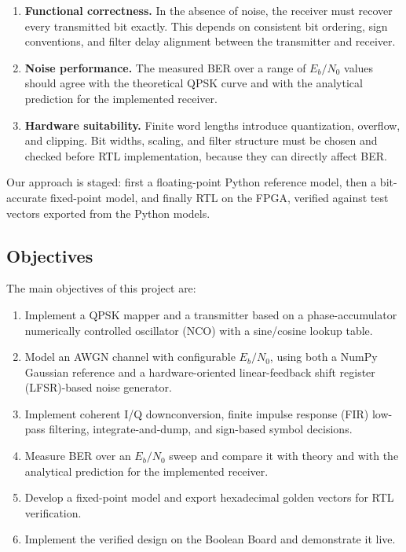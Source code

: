 \documentclass[10pt,twocolumn,letterpaper]{article}
\begin{document}
\begin{enumerate}
    \item \textbf{Functional correctness.}
    In the absence of noise, the receiver must recover every transmitted bit exactly. This depends on consistent bit ordering, sign conventions, and filter delay alignment between the transmitter and receiver.

    \item \textbf{Noise performance.}
    The measured BER over a range of $E_b/N_0$ values should agree with the theoretical QPSK curve and with the analytical prediction for the implemented receiver.

    \item \textbf{Hardware suitability.}
    Finite word lengths introduce quantization, overflow, and clipping. Bit widths, scaling, and filter structure must be chosen and checked before RTL implementation, because they can directly affect BER.
\end{enumerate}

Our approach is staged: first a floating-point Python reference model, then a bit-accurate fixed-point model, and finally RTL on the FPGA, verified against test vectors exported from the Python models.

\subsection{Objectives}

The main objectives of this project are:

\begin{enumerate}
    \item Implement a QPSK mapper and a transmitter based on a phase-accumulator numerically controlled oscillator (NCO) with a sine/cosine lookup table.

    \item Model an AWGN channel with configurable $E_b/N_0$, using both a NumPy Gaussian reference and a hardware-oriented linear-feedback shift register (LFSR)-based noise generator.

    \item Implement coherent I/Q downconversion, finite impulse response (FIR) low-pass filtering, integrate-and-dump, and sign-based symbol decisions.

    \item Measure BER over an $E_b/N_0$ sweep and compare it with theory and with the analytical prediction for the implemented receiver.

    \item Develop a fixed-point model and export hexadecimal golden vectors for RTL verification.

    \item Implement the verified design on the Boolean Board and demonstrate it live.
\end{enumerate}
\end{document}
